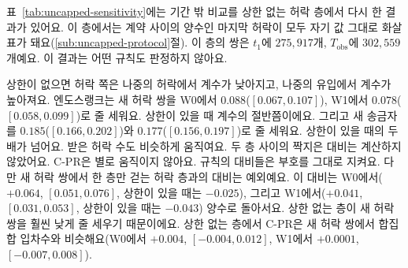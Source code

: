 
표~\ref{tab:uncapped-sensitivity}에는 기간 밖 비교를 상한 없는 허락 층에서 다시 한 결과가 있어요. 이 층에서는 계약 사이의 양수인 마지막 허락이 모두 자기 값 그대로 화살표가 돼요(\ref{sub:uncapped-protocol}절). 이 층의 쌍은 $t_1$에 $275{,}917$개, $T_{\mathrm{obs}}$에 $302{,}559$개예요. 이 결과는 어떤 규칙도 판정하지 않아요.



상한이 없으면 허락 쪽은 나중의 허락에서 계수가 낮아지고, 나중의 유입에서 계수가 높아져요. 엔도스랭크는 새 허락 쌍을 W0에서 $0.088$($[0.067,0.107]$), W1에서 $0.078$($[0.058,0.099]$)로 줄 세워요. 상한이 있을 때 계수의 절반쯤이에요. 그리고 새 송금자를 $0.185$($[0.166,0.202]$)와 $0.177$($[0.156,0.197]$)로 줄 세워요. 상한이 있을 때의 두 배가 넘어요. 받은 허락 수도 비슷하게 움직여요. 두 층 사이의 짝지은 대비는 계산하지 않았어요. \mbox{C-PR}은 별로 움직이지 않아요. 규칙의 대비들은 부호를 그대로 지켜요. 다만 새 허락 쌍에서 한 층만 걷는 허락 층과의 대비는 예외예요. 이 대비는 W0에서($+0.064$, $[0.051,0.076]$, 상한이 있을 때는 $-0.025$), 그리고 W1에서($+0.041$, $[0.031,0.053]$, 상한이 있을 때는 $-0.043$) 양수로 돌아서요. 상한 없는 층이 새 허락 쌍을 훨씬 낮게 줄 세우기 때문이에요. 상한 없는 층에서 \mbox{C-PR}은 새 허락 쌍에서 합집합 입차수와 비슷해요(W0에서 $+0.004$, $[-0.004,0.012]$, W1에서 $+0.0001$, $[-0.007,0.008]$).


